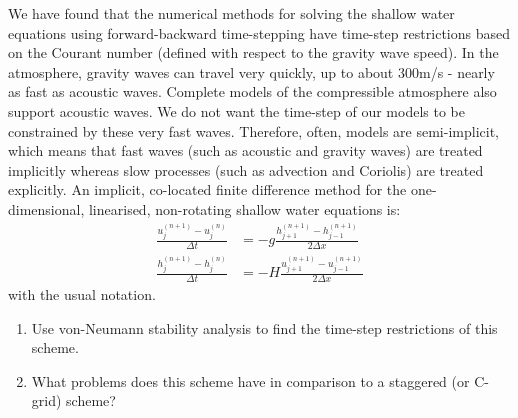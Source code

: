 We have found that the numerical methods for solving the shallow water
equations using forward-backward time-stepping have time-step restrictions
based on the Courant number (defined with respect to the gravity wave
speed). In the atmosphere, gravity waves can travel very quickly,
up to about 300m/s - nearly as fast as acoustic waves. Complete models
of the compressible atmosphere also support acoustic waves. We do
not want the time-step of our models to be constrained by these very
fast waves. Therefore, often, models are semi-implicit, which means
that fast waves (such as acoustic and gravity waves) are treated implicitly
whereas slow processes (such as advection and Coriolis) are treated
explicitly. An implicit, co-located finite difference method for the
one-dimensional, linearised, non-rotating shallow water equations
is:
\begin{align}
\frac{u_{j}^{(n+1)}-u_{j}^{(n)}}{\Delta t} & =-g\frac{h_{j+1}^{(n+1)}-h_{j-1}^{(n+1)}}{2\Delta x}\label{eqn:SWEuBA}\\
\frac{h_{j}^{(n+1)}-h_{j}^{(n)}}{\Delta t} & =-H\frac{u_{j+1}^{(n+1)}-u_{j-1}^{(n+1)}}{2\Delta x}\label{eqn:SWEhBA}
\end{align}
with the usual notation.
\begin{enumerate}
\item Use von-Neumann stability analysis to find the time-step restrictions
of this scheme.
\item What problems does this scheme have in comparison to a staggered (or
C-grid) scheme?
\end{enumerate}
